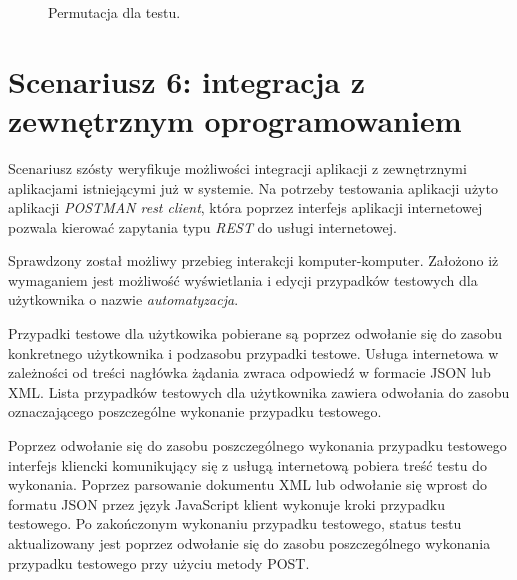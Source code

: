 \begin{figure}[h]
%
\caption{Permutacja dla testu.}
\label{fig:permutacje}
\end{figure}

\section{Scenariusz 6: integracja z zewnętrznym oprogramowaniem}

Scenariusz szósty weryfikuje możliwości integracji aplikacji z zewnętrznymi aplikacjami istniejącymi już w systemie. Na potrzeby testowania aplikacji użyto aplikacji \textit{POSTMAN rest client}\cite{postman}, która poprzez interfejs aplikacji internetowej pozwala kierować zapytania typu \textit{REST} do usługi internetowej.

Sprawdzony został możliwy przebieg interakcji komputer-komputer. Założono iż wymaganiem jest możliwość wyświetlania i edycji przypadków testowych dla użytkownika o nazwie \textit{automatyzacja}.

Przypadki testowe dla użytkowika pobierane są poprzez odwołanie się do zasobu konkretnego użytkownika i podzasobu przypadki testowe. Usługa internetowa w zależności od treści nagłówka żądania zwraca odpowiedź w formacie JSON lub XML. Lista przypadków testowych dla użytkownika zawiera odwołania do zasobu oznaczającego poszczególne wykonanie przypadku testowego.

Poprzez odwołanie się do zasobu poszczególnego wykonania przypadku testowego interfejs kliencki komunikujący się z usługą internetową pobiera treść testu do wykonania. Poprzez parsowanie dokumentu XML lub odwołanie się wprost do formatu JSON przez język JavaScript klient wykonuje kroki przypadku testowego. Po zakończonym wykonaniu przypadku testowego, status testu aktualizowany jest poprzez odwołanie się do zasobu poszczególnego wykonania przypadku testowego przy użyciu metody POST.


